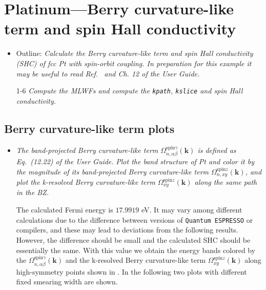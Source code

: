 \section{Platinum---Berry curvature-like term and spin Hall conductivity}
\label{sec29:PtSHC}

\begin{itemize}
	\item Outline: {\it Calculate the Berry curvature-like term and spin Hall conductivity (SHC)
	of fcc Pt with spin-orbit coupling. In preparation for this example it may be useful to read Ref.~ and Ch. 12 of the User Guide.}
\end{itemize}

\begin{itemize}
	\item[1-6] {\it Compute the MLWFs and compute the {\tt kpath}, {\tt kslice} and spin Hall conductivity.} 
\end{itemize}

\subsection*{Berry curvature-like term plots}
\begin{itemize}
	\item {\it The band-projected Berry curvature-like term $\Omega_{n,\alpha\beta}^{\text{spin} \gamma}({\bm k})$ 
		is defined as Eq.~(12.22) of the User Guide.}
	{\it Plot the band structure of Pt and color it 
		by the magnitude of its band-projected Berry curvature-like term $\Omega_{n,xy}^{\text{spin}z}(\bm k)$, 
		and plot the k-resolved Berry curvature-like term $\Omega_{xy}^{\text{spin}z}(\bm k)$ along the 
		same path in the BZ. }

	The calculated Fermi energy is $17.9919$ eV. It may vary among different calculations due to the difference between versions of {\tt Quantum ESPRESSO} or compilers, and these may lead to deviations from the following results. However, the difference should be small and the calculated SHC should be essentially the same. With this value we obtain the energy bands colored by the 
	$\Omega_{n,\alpha\beta}^{\text{spin} \gamma}({\bm k})$ and the k-resolved Berry curvature-like term $\Omega_{xy}^{\text{spin}z}(\bm k)$ along high-symmetry points shown in . 
	In the following two plots with different fixed smearing width are shown.
\end{itemize}

